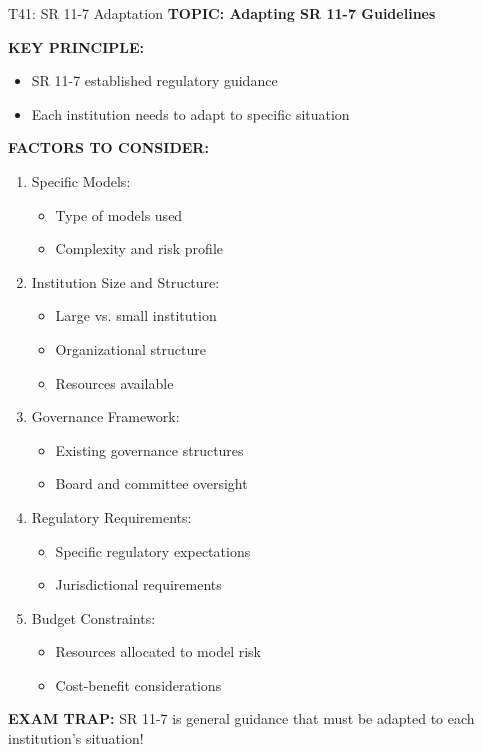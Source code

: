 \documentclass[8pt]{beamer}
\begin{document}
	\begin{frame}{T41: SR 11-7 Adaptation}
		\fontsize{6.5}{7.5}\selectfont
		\textbf{TOPIC: Adapting SR 11-7 Guidelines}
		
		\vspace{0.1cm}
		\textbf{KEY PRINCIPLE:}
		\begin{itemize}
			\item SR 11-7 established regulatory guidance
			\item Each institution needs to adapt to specific situation
		\end{itemize}
		
		\vspace{0.1cm}
		\textbf{FACTORS TO CONSIDER:}
		\begin{enumerate}
			\item \textcolor{myblue}{Specific Models:}
			\begin{itemize}
				\item Type of models used
				\item Complexity and risk profile
			\end{itemize}
			\item \textcolor{myblue}{Institution Size and Structure:}
			\begin{itemize}
				\item Large vs. small institution
				\item Organizational structure
				\item Resources available
			\end{itemize}
			\item \textcolor{myblue}{Governance Framework:}
			\begin{itemize}
				\item Existing governance structures
				\item Board and committee oversight
			\end{itemize}
			\item \textcolor{myblue}{Regulatory Requirements:}
			\begin{itemize}
				\item Specific regulatory expectations
				\item Jurisdictional requirements
			\end{itemize}
			\item \textcolor{myblue}{Budget Constraints:}
			\begin{itemize}
				\item Resources allocated to model risk
				\item Cost-benefit considerations
			\end{itemize}
		\end{enumerate}
		
		\textcolor{myred}{\textbf{EXAM TRAP:}} SR 11-7 is general guidance that \textcolor{myblue}{must be adapted to each institution's situation}!
	\end{frame}
	
\end{document}
